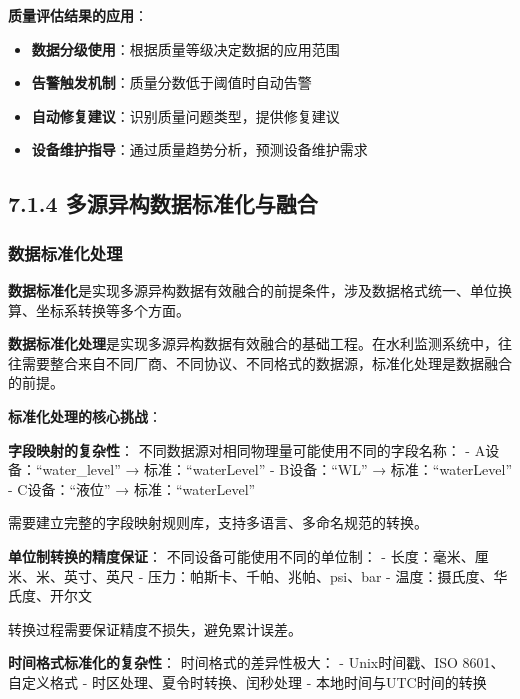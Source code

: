 \textbf{质量评估结果的应用}：

\begin{itemize}
\tightlist
\item
  \textbf{数据分级使用}：根据质量等级决定数据的应用范围
\item
  \textbf{告警触发机制}：质量分数低于阈值时自动告警
\item
  \textbf{自动修复建议}：识别质量问题类型，提供修复建议
\item
  \textbf{设备维护指导}：通过质量趋势分析，预测设备维护需求
\end{itemize}

\subsection{7.1.4 多源异构数据标准化与融合}\label{ux591aux6e90ux5f02ux6784ux6570ux636eux6807ux51c6ux5316ux4e0eux878dux5408}

\subsubsection{数据标准化处理}\label{ux6570ux636eux6807ux51c6ux5316ux5904ux7406}

\textbf{数据标准化}是实现多源异构数据有效融合的前提条件，涉及数据格式统一、单位换算、坐标系转换等多个方面。

\textbf{数据标准化处理}是实现多源异构数据有效融合的基础工程。在水利监测系统中，往往需要整合来自不同厂商、不同协议、不同格式的数据源，标准化处理是数据融合的前提。

\textbf{标准化处理的核心挑战}：

\textbf{字段映射的复杂性}： 不同数据源对相同物理量可能使用不同的字段名称： - A设备：``water\_level'' → 标准：``waterLevel'' - B设备：``WL'' → 标准：``waterLevel'' - C设备：``液位'' → 标准：``waterLevel''

需要建立完整的字段映射规则库，支持多语言、多命名规范的转换。

\textbf{单位制转换的精度保证}： 不同设备可能使用不同的单位制： - 长度：毫米、厘米、米、英寸、英尺 - 压力：帕斯卡、千帕、兆帕、psi、bar - 温度：摄氏度、华氏度、开尔文

转换过程需要保证精度不损失，避免累计误差。

\textbf{时间格式标准化的复杂性}： 时间格式的差异性极大： - Unix时间戳、ISO 8601、自定义格式 - 时区处理、夏令时转换、闰秒处理 - 本地时间与UTC时间的转换

